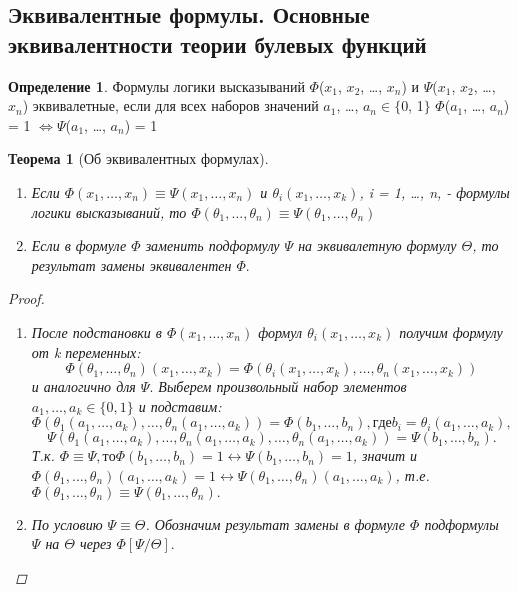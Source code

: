 \documentclass[a4paper]{article}
\newtheorem{theorem}{Теорема}[section]
\theoremstyle{definition}
\newtheorem*{definition}{Определение}
\theoremstyle{remark}
\begin{document}
    \subsection{Эквивалентные формулы. Основные эквивалентности теории булевых функций}
	\begin{definition}
		Формулы логики высказываний 	$\Phi$($x_1$, $x_2$, \dots , $x_n$) и $\Psi$($x_1$, $x_2$, \dots , $x_n$) эквивалетные, если для всех наборов значений $a_1$, \dots , $a_n\in\{$0, 1$\}$
		$\Phi$($a_1$, \dots , $a_n$) = 1 $\Leftrightarrow \Psi$($a_1$, \dots , $a_n$) = 1
	\end{definition}
    \begin{theorem}[Об эквивалентных формулах]


        \begin{enumerate}
           	\item Если $\Phi(x_1, \dots , x_n) \equiv \Psi(x_1, \dots , x_n)$ и $\theta_i(x_1, \dots , x_k)$, i = 1, \dots , n, - формулы логики высказываний, то $\Phi(\theta_1, \dots , \theta_n) \equiv \Psi(\theta_1, \dots , \theta_n)$
		\item Если в формуле $\Phi$ заменить подформулу $\Psi$ на эквивалетную формулу $\Theta$, то результат замены эквивалентен $\Phi.$
        \end{enumerate}
	\begin{proof}
		\begin{enumerate}
			\item После подстановки в $\Phi(x_1, \dots , x_n)$ формул $\theta_i(x_1, \dots , x_k)$ получим формулу от k переменных: $$\Phi(\theta_1, \dots , \theta_n)(x_1, \dots , x_k) = \Phi(\theta_i(x_1, \dots , x_k), \dots , \theta_n(x_1, \dots , x_k))$$ и аналогично для $\Psi.$ Выберем произвольный набор элементов $a_1, \dots , a_k \in \{0, 1\}$ и подставим: $$\Phi(\theta_1(a_1, \dots , a_k), \dots , \theta_n(a_1, \dots , a_k)) = \Phi(b_1, \dots , b_n), где b_i = \theta_i(a_1, \dots , a_k),$$ $$\Psi(\theta_1(a_1, \dots , a_k), \dots , \theta_n(a_1, \dots , a_k), \dots , \theta_n(a_1, \dots , a_k)) = \Psi(b_1, \dots , b_n).$$ Т.к. $\Phi \equiv \Psi, то \Phi(b_1, \dots , b_n) = 1 \leftrightarrow \Psi(b_1, \dots , b_n) = 1$, значит и $\Phi(\theta_1, \dots , \theta_n)(a_1, \dots , a_k) = 1 \leftrightarrow \Psi(\theta_1, \dots , \theta_n)(a_1, \dots , a_k)$, т.е. $\Phi(\theta_1, \dots , \theta_n) \equiv \Psi(\theta_1, \dots , \theta_n).$
			\item По условию $\Psi \equiv \Theta$. Обозначим результат замены в формуле $\Phi$ подформулы $\Psi$ на $\Theta$ через $\Phi[\Psi/\Theta].$


\end{enumerate}
\end{proof}
\end{theorem}
\end{document}
